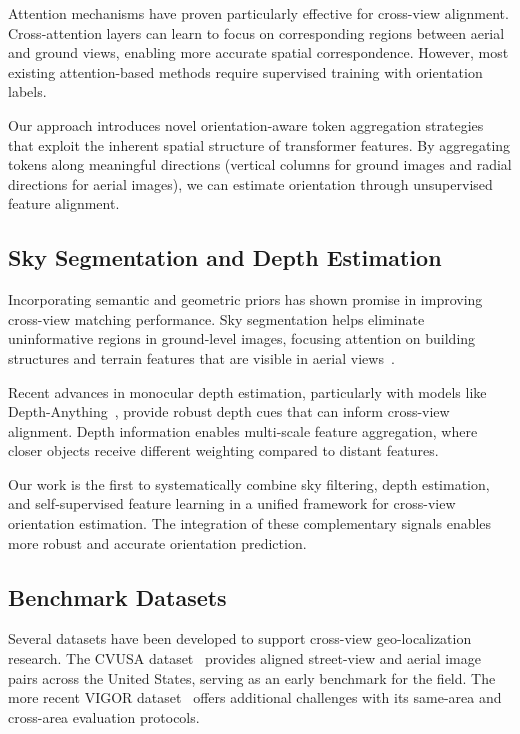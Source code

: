 Attention mechanisms have proven particularly effective for cross-view alignment. Cross-attention layers can learn to focus on corresponding regions between aerial and ground views, enabling more accurate spatial correspondence. However, most existing attention-based methods require supervised training with orientation labels.

Our approach introduces novel orientation-aware token aggregation strategies that exploit the inherent spatial structure of transformer features. By aggregating tokens along meaningful directions (vertical columns for ground images and radial directions for aerial images), we can estimate orientation through unsupervised feature alignment.

\subsection{Sky Segmentation and Depth Estimation}

Incorporating semantic and geometric priors has shown promise in improving cross-view matching performance. Sky segmentation helps eliminate uninformative regions in ground-level images, focusing attention on building structures and terrain features that are visible in aerial views~\cite{workman2015predicting}.

Recent advances in monocular depth estimation, particularly with models like Depth-Anything~\cite{yang2024depth}, provide robust depth cues that can inform cross-view alignment. Depth information enables multi-scale feature aggregation, where closer objects receive different weighting compared to distant features.

Our work is the first to systematically combine sky filtering, depth estimation, and self-supervised feature learning in a unified framework for cross-view orientation estimation. The integration of these complementary signals enables more robust and accurate orientation prediction.

\subsection{Benchmark Datasets}

Several datasets have been developed to support cross-view geo-localization research. The CVUSA dataset~\cite{workman2015predicting} provides aligned street-view and aerial image pairs across the United States, serving as an early benchmark for the field. The more recent VIGOR dataset~\cite{zhu2021vigor} offers additional challenges with its same-area and cross-area evaluation protocols.

